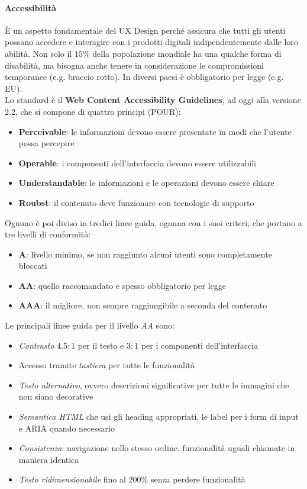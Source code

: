 \paragraph{Accessibilità} È un aspetto fondamentale del UX Design perché assicura che tutti gli utenti possano accedere e interagire con i prodotti digitali indipendentemente dalle loro abilità. Non solo il $15\%$ della popolazione mondiale ha una qualche forma di disabilità, ma bisogna anche tenere in considerazione le compromissioni temporanee (e.g. braccio rotto). In diversi paesi è obbligatorio per legge (e.g. EU).\\
Lo standard è il \textbf{Web Content Accessibility Guidelines}, ad oggi alla versione 2.2, che si compone di quattro principi (POUR):
\begin{itemize}
	\item \textbf{Perceivable}: le informazioni devono essere presentate in modi che l'utente possa percepire
	\item \textbf{Operable}: i componenti dell'interfaccia devono essere utilizzabili
	\item \textbf{Understandable}: le informazioni e le operazioni devono essere chiare
	\item \textbf{Roubst}: il contenuto deve funzionare con tecnologie di supporto
\end{itemize}
Ognuno è poi diviso in tredici linee guida, ognuna con i suoi criteri, che portano a tre livelli di conformità:
\begin{itemize}
	\item \textbf{A}: livello minimo, se non raggiunto alcuni utenti sono completamente bloccati
	\item \textbf{AA}: quello raccomandato e spesso obbligatorio per legge
	\item \textbf{AAA}: il migliore, non sempre raggiungibile a seconda del contenuto
\end{itemize}
Le principali linee guida per il livello \textit{AA} sono:
\begin{itemize}
	\item \textit{Contrasto} $4.5:1$ per il testo e $3:1$ per i componenti dell'interfaccia
	\item Accesso tramite \textit{tastiera} per tutte le funzionalità
	\item \textit{Testo alternativo}, ovvero descrizioni significative per tutte le immagini che non siano decorative
	\item \textit{Semantica HTML} che usi gli heading appropriati, le label per i form di input e ARIA quando necessario
	\item \textit{Consistenza}: navigazione nello stesso ordine, funzionalità uguali chiamate in maniera identica
	\item \textit{Testo ridimensionabile} fino al $200\%$ senza perdere funzionalità
\end{itemize}

